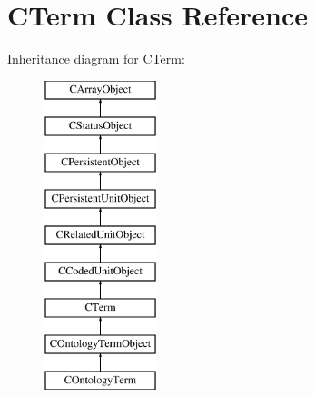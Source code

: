 \hypertarget{class_c_term}{\section{C\-Term Class Reference}
\label{class_c_term}
}
Inheritance diagram for C\-Term\-:\begin{figure}[H]
\begin{center}
\leavevmode
\includegraphics[height=9.000000cm]{class_c_term}
\end{center}
\end{figure}
